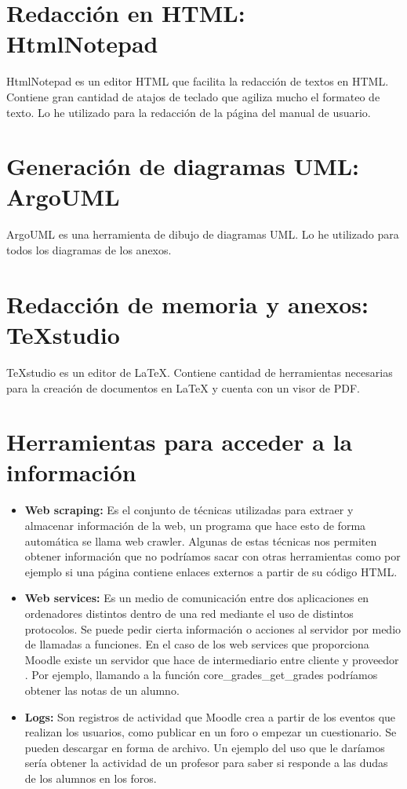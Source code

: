 \section{Redacción en HTML: HtmlNotepad}
HtmlNotepad es un editor HTML que facilita la redacción de textos en HTML. Contiene gran cantidad de atajos de teclado que agiliza mucho el formateo de texto. Lo he utilizado para la redacción de la página del manual de usuario.
\section{Generación de diagramas UML: ArgoUML}
ArgoUML es una herramienta de dibujo de diagramas UML. Lo he utilizado para todos los diagramas de los anexos. 
\section{Redacción de memoria y anexos: TeXstudio}
TeXstudio es un editor de LaTeX. Contiene cantidad de herramientas necesarias para la creación de documentos en LaTeX y cuenta con un visor de PDF.
 
 
 
 
 
 
\section{Herramientas para acceder a la información}
\begin{itemize}
	\item \textbf{Web scraping:}
	Es el conjunto de técnicas utilizadas para extraer y almacenar información de la web, un programa que hace esto de forma automática se llama web crawler. Algunas de estas técnicas nos permiten obtener información que no podríamos sacar con otras herramientas como por ejemplo si una página contiene enlaces externos a partir de su código HTML.
	\item \textbf{Web services:}
	Es un medio de comunicación entre dos aplicaciones en ordenadores distintos dentro de una red mediante el uso de distintos protocolos. Se puede pedir cierta información o acciones al servidor por medio de llamadas a funciones. En el caso de los web services que proporciona Moodle existe un servidor que hace de intermediario entre cliente y proveedor \cite{moodle-2020}. Por ejemplo, llamando a la función core\_grades\_get\_grades podríamos obtener las notas de un alumno.
	\item \textbf{Logs:}
	Son registros de actividad que Moodle crea a partir de los eventos que realizan los usuarios, como publicar en un foro o empezar un cuestionario. Se pueden descargar en forma de archivo. Un ejemplo del uso que le daríamos sería obtener la actividad de un profesor para saber si responde a las dudas de los alumnos en los foros.
\end{itemize}
